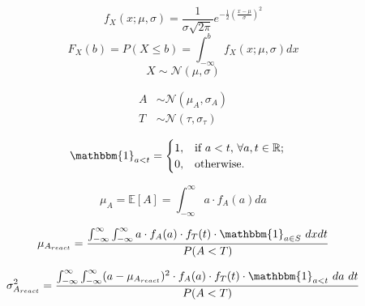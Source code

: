 \documentclass[12pt,letterpaper]{article}
\begin{document}
\begin{equation}
    f_{X}(x; \mu, \sigma) = \frac{1}{\sigma\sqrt{2\pi}}e^{-\frac{1}{2}(\frac{x-\mu}{\sigma})^2}
\end{equation}
\begin{equation}
    F_{X}(b) = P(X \leq b) = \int_{-\infty}^{b} f_{X}(x; \mu, \sigma)dx
\end{equation}
\begin{equation}
    X\sim\mathcal{N}(\mu,\sigma)
\end{equation}


\begin{align}
    A & \sim\mathcal{N}(\mu_{A},\sigma_{A}) \\
    T & \sim\mathcal{N}(\tau,\sigma_{\tau})
\end{align}

\begin{align}
     & \mathbbm{1}_{a<t} =
    \begin{cases}
        1, & \text{if } a <t, \, \forall a,t \in \mathbb{R}; \\
        0, & \text{otherwise.}
    \end{cases}
\end{align}

\begin{equation}
    \mu_{A} = \mathbb{E}[A] = \int_{-\infty}^{\infty}a \cdot f_{A}(a)da
\end{equation}


\begin{equation}
    \mu_{A_{react}} = \dfrac{\int_{-\infty}^{\infty}  \int_{-\infty}^{\infty} a \cdot f_{A}(a) \cdot f_{T}(t) \cdot \mathbbm{1}_{a \in S} \ dxdt} {P(A<T)}
\end{equation}

\begin{equation}
    \sigma^2_{A_{react}} = \dfrac{\int_{-\infty}^{\infty}  \int_{-\infty}^{\infty} (a - \mu_{A_{react}})^2 \cdot f_{A}(a) \cdot f_{T}(t) \cdot \mathbbm{1}_{a<t} \ da \ dt}{P(A<T)}
\end{equation}
\end{document}
